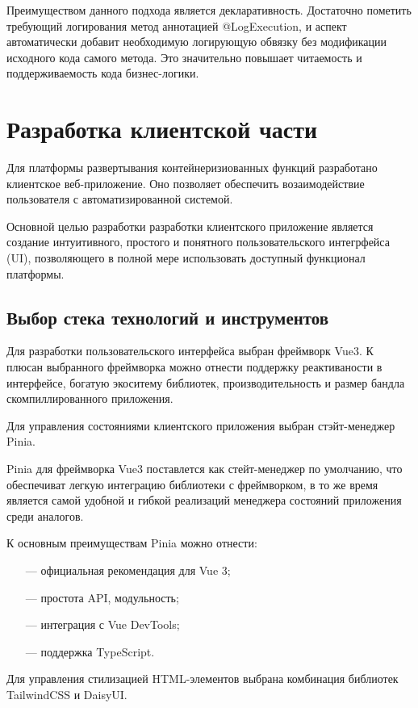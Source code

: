 Преимуществом данного подхода является декларативность. Достаточно пометить требующий логирования метод аннотацией @LogExecution, и аспект автоматически добавит необходимую логирующую обвязку без модификации исходного кода самого метода. Это значительно повышает читаемость и поддерживаемость кода бизнес-логики.

\section{Разработка клиентской части}

Для платформы развертывания контейнеризиованных функций разработано клиентское веб-приложение.
Оно позволяет обеспечить возаимодействие пользователя с автоматизированной системой.

Основной целью разработки разработки клиентского приложение является создание интуитивного, простого и понятного пользовательского интегрфейса (UI), позволяющего в полной  мере использовать доступный функционал платформы.

\subsection{Выбор стека технологий и инструментов}

Для разработки пользовательского интерфейса выбран фреймворк Vue3. К плюсан выбранного фреймворка можно отнести поддержку реактиваности в интерфейсе, богатую экоситему библиотек, производительность и размер бандла скомпиллированного приложения.

Для управления состояниями клиентского приложения выбран стэйт-менеджер Pinia.

Pinia для фреймворка Vue3 поставлется как стейт-менеджер по умолчанию, что обеспечиват легкую интеграцию библиотеки с фреймворком, в то же время является самой удобной и гибкой реализаций менеджера состояний приложения среди аналогов.

К основным преимуществам Pinia можно отнести:

\begin{itemize}
\item[---]официальная рекомендация для Vue 3;
\item[---]простота API, модульность;
\item[---]интеграция с Vue DevTools;
\item[---]поддержка TypeScript.
\end{itemize}

Для управления стилизацией HTML-элементов выбрана комбинация библиотек TailwindCSS и DaisyUI.

